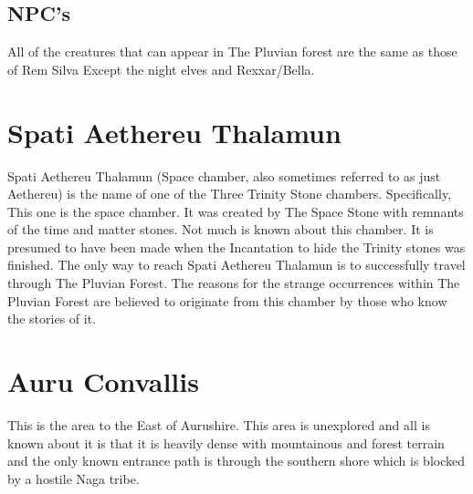 \subsection{NPC's}
All of the creatures that can appear in The Pluvian forest are the same as those of Rem Silva Except the night elves and Rexxar/Bella.

\section{Spati Aethereu Thalamun}

Spati Aethereu Thalamun (Space chamber, also sometimes referred to as just Aethereu) is the name of one of the Three Trinity Stone chambers. Specifically, This one is the space chamber. It was created by The Space Stone with remnants of the time and matter stones. Not much is known about this chamber. It is presumed to have been made when the Incantation to hide the Trinity stones was finished. The only way to reach Spati Aethereu Thalamun is to successfully travel through The Pluvian Forest. The reasons for the strange occurrences within The Pluvian Forest are believed to originate from this chamber by those who know the stories of it.





\section{Auru Convallis}

This is the area to the East of Aurushire. This area is unexplored and all is known about it is that it is heavily dense with mountainous and forest terrain and the only known entrance path is through the southern shore which is blocked by a hostile Naga tribe.